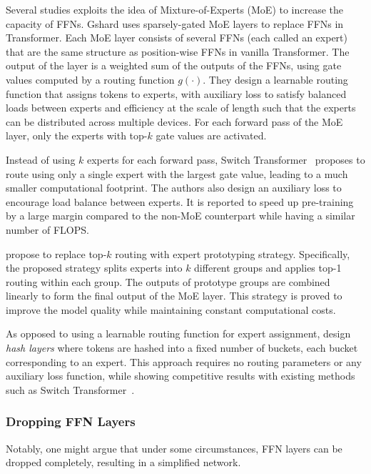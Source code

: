 \documentclass[manuscript,acmsmall,screen,nonacm]{acmart}
\theoremstyle{definition}
\begin{document}
Several studies exploits the idea of Mixture-of-Experts (MoE)\cite{shazeer17moe} to increase the capacity of FFNs. Gshard\cite{lepikhin20gshard} uses sparsely-gated MoE layers to replace FFNs in Transformer. Each MoE layer consists of several FFNs (each called an expert) that are the same structure as position-wise FFNs in vanilla Transformer. The output of the layer is a weighted sum of the outputs of the FFNs, using gate values computed by a routing function $g(\cdot)$. They design a learnable routing function that assigns tokens to experts, with auxiliary loss to satisfy balanced loads between experts and efficiency at the scale of length such that the experts can be distributed across multiple devices. For each forward pass of the MoE layer, only the experts with top-$k$ gate values are activated.

Instead of using $k$ experts for each forward pass, Switch Transformer~\cite{fedus2021switch} proposes to route using only a single expert with the largest gate value, leading to a much smaller computational footprint. The authors also design an auxiliary loss to encourage load balance between experts. It is reported to speed up pre-training by a large margin compared to the non-MoE counterpart while having a similar number of FLOPS.

\citet{yang2021exploring} propose to replace top-$k$ routing with expert prototyping strategy. Specifically, the proposed strategy splits experts into $k$ different groups and applies top-1 routing within each group. The outputs of prototype groups are combined linearly to form the final output of the MoE layer. This strategy is proved to improve the model quality while maintaining constant computational costs.

As opposed to using a learnable routing function for expert assignment,  \citet{roller2021hash} design \textit{hash layers} where tokens are hashed into a fixed number of buckets, each bucket corresponding to an expert. This approach requires no routing parameters or any auxiliary loss function, while showing competitive results with existing methods such as Switch Transformer~\cite{fedus2021switch}.

\subsubsection{Dropping FFN Layers}

Notably, one might argue that under some circumstances, FFN layers can be dropped completely, resulting in a simplified network.
\end{document}
